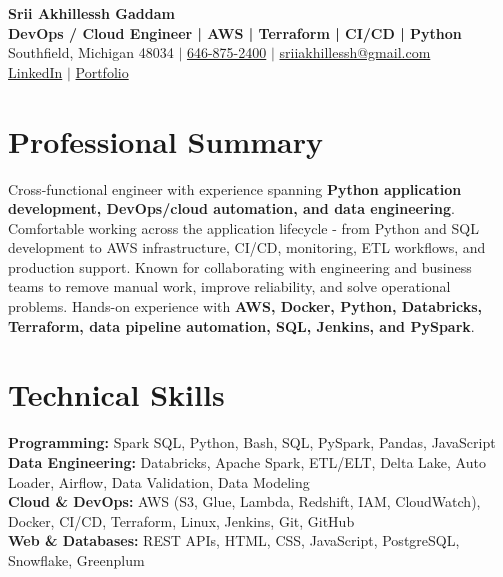\documentclass[letterpaper,10pt]{article}
\begin{document}
\fontsize{9.35pt}{10.45pt}\selectfont

\begin{center}
    {\LARGE \textbf{Srii Akhillessh Gaddam}} \\[-1pt]
    \textbf{DevOps / Cloud Engineer | AWS | Terraform | CI/CD | Python} \\[2pt]
    Southfield, Michigan 48034 $|$
    \href{tel:6468752400}{646-875-2400} $|$
    \href{mailto:sriiakhillessh@gmail.com}{sriiakhillessh@gmail.com} \\[1pt]
    \href{https://www.linkedin.com/in/srii-akhiilessh-gaddam-b48668191/}{LinkedIn} $|$
    \href{https://sriiakhillesshg.github.io/portfolio/}{Portfolio}
\end{center}
\vspace{-8pt}

\section{Professional Summary}
\small{Cross-functional engineer with experience spanning \textbf{Python application development, DevOps/cloud automation, and data engineering}. Comfortable working across the application lifecycle - from Python and SQL development to AWS infrastructure, CI/CD, monitoring, ETL workflows, and production support. Known for collaborating with engineering and business teams to remove manual work, improve reliability, and solve operational problems. Hands-on experience with \textbf{AWS, Docker, Python, Databricks, Terraform, data pipeline automation, SQL, Jenkins, and PySpark}.}

\section{Technical Skills}
\small{
\textbf{Programming:} Spark SQL, Python, Bash, SQL, PySpark, Pandas, JavaScript \\
\textbf{Data Engineering:} Databricks, Apache Spark, ETL/ELT, Delta Lake, Auto Loader, Airflow, Data Validation, Data Modeling \\
\textbf{Cloud \& DevOps:} AWS (S3, Glue, Lambda, Redshift, IAM, CloudWatch), Docker, CI/CD, Terraform, Linux, Jenkins, Git, GitHub \\
\textbf{Web \& Databases:} REST APIs, HTML, CSS, JavaScript, PostgreSQL, Snowflake, Greenplum
}
\end{document}

